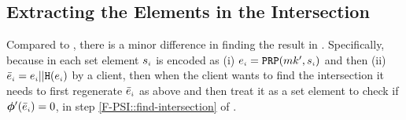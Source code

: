  
\subsection{Extracting the Elements in the Intersection}\label{sec::Extracting-Elements-in-Intersection}
Compared to \fpsi, there is a minor difference in finding the result in \epsi. Specifically, because in \epsi each set element  $s_{\scriptscriptstyle i}$ is encoded as  (i) $e_{\scriptscriptstyle i}=\mathtt{PRP}(mk', s_{\scriptscriptstyle i})$ and then (ii) $\bar{e}_{\scriptscriptstyle i} =e_{\scriptscriptstyle i} || \mathtt{H}(e_{\scriptscriptstyle i})$ by a client, then when the client wants to find the intersection it needs to first regenerate $\bar{e}_{\scriptscriptstyle i}$ as above and then treat it as a set element to check if  $\bm\phi'(\bar e_{\scriptscriptstyle i})=0$, in step \ref{F-PSI::find-intersection} of \fpsi. 

%



%





